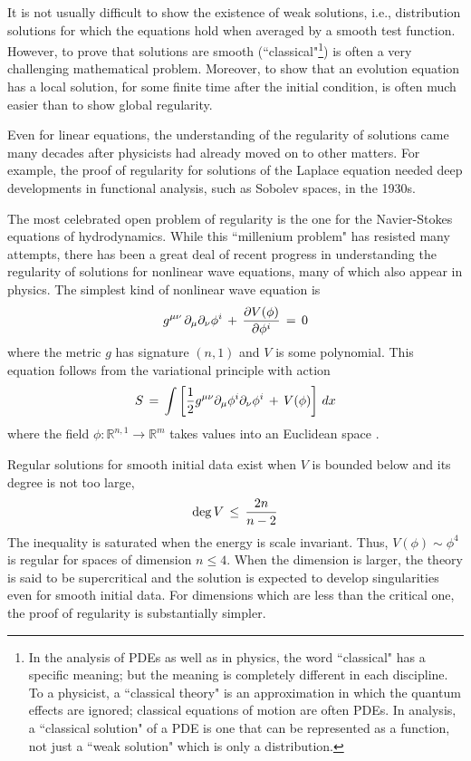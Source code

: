 \documentclass{amsart}
\begin{document}
It is not usually difficult to show the existence of weak solutions, i.e., distribution solutions for which the equations hold  when averaged by a smooth test function. However, to prove that solutions are smooth  (``classical"\footnote{In the analysis of PDEs as well as in physics, the word ``classical" has a specific meaning; but the meaning is completely different in each discipline. To a physicist, a ``classical theory" is an approximation in which the quantum effects are ignored; classical equations of motion are often PDEs. In analysis, a ``classical solution" of a PDE is one that can  be represented as a function, not just a ``weak solution" which is only a distribution.})  is often  a very challenging mathematical problem. Moreover, to show that an evolution equation has a local solution, for some finite time after the initial condition, is often much easier than to show  global regularity.

Even for linear equations, the understanding of the regularity of solutions came many decades after physicists had already moved on to other matters. For example, the proof of regularity for solutions of the Laplace equation needed deep developments in functional analysis, such as Sobolev spaces, in the 1930s.

The most celebrated open problem of regularity is the one for the Navier-Stokes equations of hydrodynamics. While this ``millenium problem" has resisted many attempts, there has been a great deal of recent  progress in understanding the regularity of solutions for nonlinear wave equations, many of which also appear in physics. The simplest kind of nonlinear wave equation  is
\begin{equation}
g^{\mu\nu}\,\partial_\mu\partial_\nu \phi^i \,+\, {\partial V(\phi)\over \partial \phi^i}\,=\,0
\end{equation}
where the metric $g$ has signature $(n,1)$ and $V$ is some polynomial. This equation follows from the variational principle with action
\begin{equation}
S \,=\,  \int  \left[ {1\over 2} g^{\mu\nu} \partial_\mu\phi^i \partial_\nu\phi^i \, + \, V(\phi)\right]\,dx
\end{equation}
where the field $\phi:\mathbb{R}^{n,1}\to \mathbb{R}^m$ takes values into an Euclidean space .

Regular solutions for smooth initial data exist \cite{MR1078267,MR1162370} when $V$ is bounded below and its degree is not too large,
\begin{equation}
{\rm deg}\,V\,\leq\, {2n\over n-2}
\end{equation}
The inequality is saturated when the energy is scale invariant.  Thus, $V(\phi)\sim \phi^4$ is regular for spaces of dimension $n\leq 4$. When the dimension is larger, the theory is said to be supercritical and the solution is expected to develop singularities even for smooth initial data. For dimensions which are less than the critical one, the proof of regularity is substantially simpler.
\end{document}
